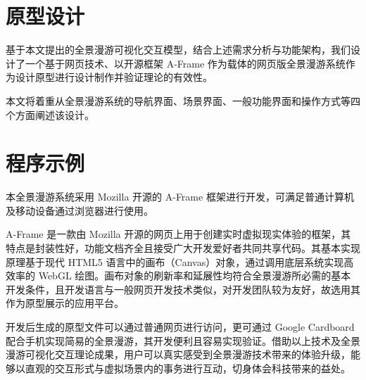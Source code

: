 \section{原型设计}
基于本文提出的全景漫游可视化交互模型，结合上述需求分析与功能架构，我们设计了一个基于网页技术、以开源框架 A-Frame 作为载体的网页版全景漫游系统作为设计原型进行设计制作并验证理论的有效性。

本文将着重从全景漫游系统的导航界面、场景界面、一般功能界面和操作方式等四个方面阐述该设计。


\section{程序示例}
本全景漫游系统采用 Mozilla 开源的 A-Frame 框架进行开发，可满足普通计算机及移动设备通过浏览器进行使用。

A-Frame 是一款由 Mozilla 开源的网页上用于创建实时虚拟现实体验的框架，其特点是封装性好，功能文档齐全且接受广大开发爱好者共同共享代码。其基本实现原理基于现代 HTML5 语言中的画布（Canvas）对象，通过调用底层系统实现高效率的 WebGL 绘图。画布对象的刷新率和延展性均符合全景漫游所必需的基本开发条件，且开发语言与一般网页开发技术类似，对开发团队较为友好，故选用其作为原型展示的应用平台。

开发后生成的原型文件可以通过普通网页进行访问，更可通过 Google Cardboard 配合手机实现简易的全景漫游，其开发便利且容易实现验证。借助以上技术及全景漫游可视化交互理论成果，用户可以真实感受到全景漫游技术带来的体验升级，能够以直观的交互形式与虚拟场景内的事务进行互动，切身体会科技带来的益处。
